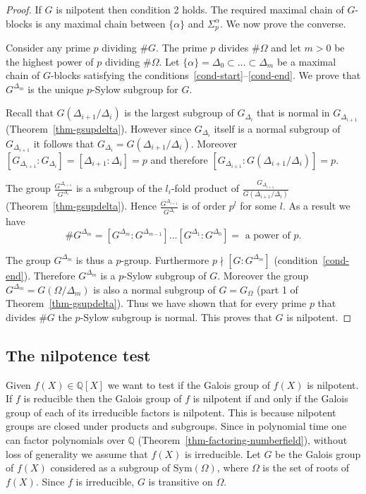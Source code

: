 \documentclass[11pt]{madras}%
\theoremstyle{remark}
\newcommand{\Sym}[1]{{\ensuremath{\mathrm{Sym}\left(#1\right)}}}
\newcommand{\Gof}[2][G]{{\ensuremath{#1\left(#2\right)}}}
\begin{document}
\begin{proof}
  If $G$ is nilpotent then condition 2 holds. The required maximal
  chain of $G$-blocks is any maximal chain between $\{ \alpha \}$ and
  $\Sigma_p^\alpha$. We now prove the converse.

  Consider any prime $p$ dividing $\# G$. The prime $p$ divides $\#
  \Omega$ and let $m> 0$ be the highest power of $p$ dividing $\#
  \Omega$.  Let $\{ \alpha \} = \Delta_0 \subset \ldots \subset
  \Delta_m$ be a maximal chain of $G$-blocks satisfying the
  conditions~\ref{cond-start}--\ref{cond-end}.  We prove that
  $G^{\Delta_m}$ is the unique $p$-Sylow subgroup for $G$.

  Recall that $\Gof{\Delta_{i+1}/\Delta_i}$ is the largest subgroup of
  $G_{\Delta_i}$ that is normal in $G_{\Delta_{i+1}}$
  (Theorem~\ref{thm-gsupdelta}). However since $G_{\Delta_i}$ itself
  is a normal subgroup of $G_{\Delta_{i+1}}$ it follows that
  $G_{\Delta_i} = \Gof{\Delta_{i+1}/\Delta_i}$. Moreover
  $[G_{\Delta_{i+1}}:G_{\Delta_i}] = [\Delta_{i+1} : \Delta_i] = p$
  and therefore $[G_{\Delta_{i+1}}: \Gof{\Delta_{i+1}/\Delta_i}] = p$.

  The group $\frac{G^{\Delta_{i+1}}}{G^{\Delta_i}}$ is a subgroup of
  the $l_i$-fold product of
  $\frac{G_{\Delta_{i+1}}}{\Gof{\Delta_{i+1}/\Delta_i}}$
  (Theorem~\ref{thm-gsupdelta}). Hence
  $\frac{G^{\Delta_{i+1}}}{G^{\Delta_i}}$ is of order $p^l$ for some
  $l$. As a result we have
  \[
  \# G^{\Delta_m} = [G^{\Delta_m}:G^{\Delta_{m-1}}]\ldots
  [G^{\Delta_1}: G^{\Delta_0}] = \textrm{ a power of }p.
  \]

  The group $G^{\Delta_m}$ is thus a $p$-group. Furthermore $p \nmid
  [G : G^{\Delta_m}]$ (condition~\ref{cond-end}). Therefore
  $G^{\Delta_m}$ is a $p$-Sylow subgroup of $G$.  Moreover the group
  $G^{\Delta_m} = \Gof{\Omega/\Delta_m}$ is also a normal subgroup of
  $G = G_\Omega$ (part 1 of Theorem~\ref{thm-gsupdelta}).  Thus we
  have shown that for every prime $p$ that divides $\#G$ the $p$-Sylow
  subgroup is normal.  This proves that $G$ is nilpotent.
\end{proof}


\subsection{The nilpotence test}

Given $f(X) \in \mathbb{Q}[X]$ we want to test if the Galois group of
$f(X)$ is nilpotent. If $f$ is reducible then the Galois group of $f$
is nilpotent if and only if the Galois group of each of its
irreducible factors is nilpotent.  This is because nilpotent groups
are closed under products and subgroups.  Since in polynomial time one
can factor polynomials over $\mathbb{Q}$
(Theorem~\ref{thm-factoring-numberfield}), without loss of generality
we assume that $f(X)$ is irreducible.  Let $G$ be the Galois group of
$f(X)$ considered as a subgroup of $\Sym{\Omega}$, where $\Omega$ is
the set of roots of $f(X)$. Since $f$ is irreducible, $G$ is
transitive on $\Omega$.
\end{document}
